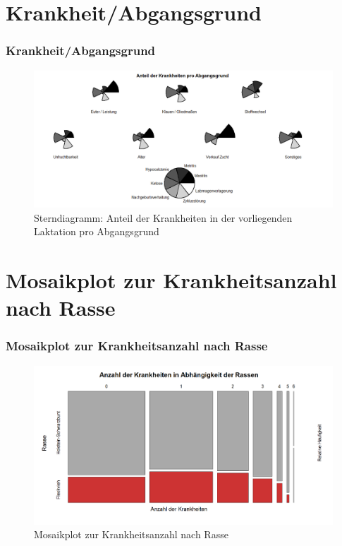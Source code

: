 \documentclass{beamer}
\begin{document}
	\section{Krankheit/Abgangsgrund}
\begin{frame}
		\frametitle{Krankheit/Abgangsgrund}
		\begin{figure}[h]
			\centering
			\includegraphics[scale=0.35]{Sterndiagramm.png}
			\vspace{}
			\caption{Sterndiagramm: Anteil der Krankheiten in der vorliegenden Laktation pro Abgangsgrund}
		\end{figure}
	\end{frame}
		\section{Mosaikplot zur Krankheitsanzahl nach Rasse}
	\begin{frame}
		\frametitle{Mosaikplot zur Krankheitsanzahl nach Rasse}
		\begin{figure}[h]
			\centering
			\includegraphics[scale=0.35]{Mosaikplots.png}
			\vspace{-0.6cm}
			\caption{Mosaikplot zur Krankheitsanzahl nach Rasse}
		\end{figure}
	\end{frame}
\end{document}
